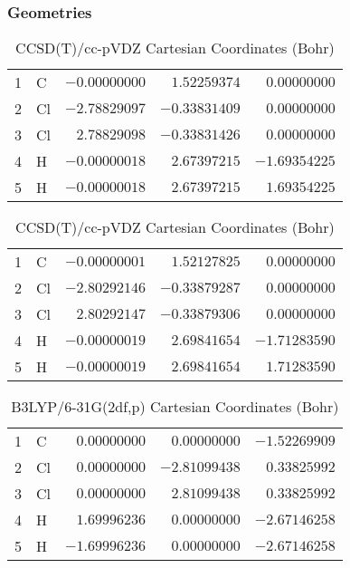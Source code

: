 \documentclass[10pt,oneside]{article}
\begin{document}
\begin{table}[h!]
\subsubsection*{Geometries}
\begin{multicols}{2}
\centering
\caption{CCSD(T)/cc-pVTZ Cartesian Coordinates (Bohr)}
\begin{tabular}{llrrr}
\toprule
1  & C  & $-0.00000000$ & $ 1.52259374$ & $ 0.00000000$ \\
2  & Cl & $-2.78829097$ & $-0.33831409$ & $ 0.00000000$ \\
3  & Cl & $ 2.78829098$ & $-0.33831426$ & $ 0.00000000$ \\
4  & H  & $-0.00000018$ & $ 2.67397215$ & $-1.69354225$ \\
5  & H  & $-0.00000018$ & $ 2.67397215$ & $ 1.69354225$ \\
\bottomrule
\end{tabular}
\caption{CCSD(T)/cc-pVDZ Cartesian Coordinates (Bohr)}
\begin{tabular}{llrrr}
\toprule
1  & C  & $-0.00000001$ & $ 1.52127825$ & $ 0.00000000$ \\
2  & Cl & $-2.80292146$ & $-0.33879287$ & $ 0.00000000$ \\
3  & Cl & $ 2.80292147$ & $-0.33879306$ & $ 0.00000000$ \\
4  & H  & $-0.00000019$ & $ 2.69841654$ & $-1.71283590$ \\
5  & H  & $-0.00000019$ & $ 2.69841654$ & $ 1.71283590$ \\
\bottomrule
\end{tabular}
\end{multicols}
\end{table}

\begin{table}[h]
\centering
\caption{B3LYP/6-31G(2df,p) Cartesian Coordinates (Bohr)}
\begin{tabular}{llrrr}
\toprule
1  & C  & $ 0.00000000$ & $ 0.00000000$ & $-1.52269909$ \\
2  & Cl & $ 0.00000000$ & $-2.81099438$ & $ 0.33825992$ \\
3  & Cl & $ 0.00000000$ & $ 2.81099438$ & $ 0.33825992$ \\
4  & H  & $ 1.69996236$ & $ 0.00000000$ & $-2.67146258$ \\
5  & H  & $-1.69996236$ & $ 0.00000000$ & $-2.67146258$ \\
\bottomrule
\end{tabular}
\end{table}
\end{document}
